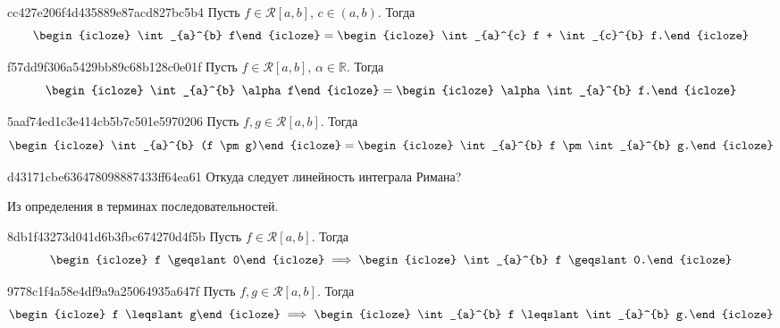 \begin{note}{cc427e206f4d435889e87acd827bc5b4}
    Пусть \({ f \in \mathcal R[a, b] }\),  \({ c \in (a, b) }\).
    Тогда
    \[
        \begin{icloze}{2}\int_{a}^{b} f\end{icloze} = \begin{icloze}{1}\int_{a}^{c} f + \int_{c}^{b} f.\end{icloze}
    \]
\end{note}

\begin{note}{f57dd9f306a5429bb89c68b128c0e01f}
    Пусть \({ f \in \mathcal R[a, b] }\), \({ \alpha \in \mathbb R }\).
    Тогда
    \[
        \begin{icloze}{2}\int_{a}^{b} \alpha f\end{icloze} = \begin{icloze}{1}\alpha \int_{a}^{b} f.\end{icloze}
    \]
\end{note}

\begin{note}{5aaf74ed1c3e414cb5b7c501e5970206}
    Пусть \({ f, g \in \mathcal R[a, b] }\).
    Тогда
    \[
        \begin{icloze}{2}\int_{a}^{b} (f \pm g)\end{icloze} = \begin{icloze}{1}\int_{a}^{b} f \pm \int_{a}^{b} g.\end{icloze}
    \]
\end{note}

\begin{note}{d43171cbe636478098887433ff64ea61}
    Откуда следует линейность интеграла Римана?

    \begin{cloze}{1}
        Из определения в терминах последовательностей.
    \end{cloze}
\end{note}

\begin{note}{8db1f43273d041d6b3fbc674270d4f5b}
    Пусть \({ f \in \mathcal R[a, b] }\).
    Тогда
    \[
        \begin{icloze}{2}f \geqslant 0\end{icloze} \implies \begin{icloze}{1}\int_{a}^{b} f \geqslant 0.\end{icloze}
    \]
\end{note}

\begin{note}{9778c1f4a58e4df9a9a25064935a647f}
    Пусть \({ f, g \in \mathcal R[a, b] }\).
    Тогда
    \[
        \begin{icloze}{2}f \leqslant g\end{icloze} \implies \begin{icloze}{1}\int_{a}^{b} f \leqslant \int_{a}^{b} g.\end{icloze}
    \]
\end{note}

